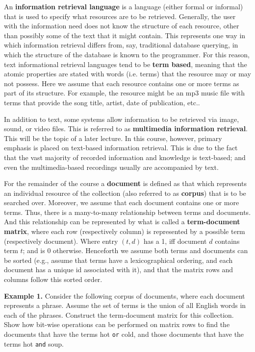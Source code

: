 \documentclass [12pt]{article}
\begin{document}
\vspace{0.5in}
An \textbf{information retrieval language} is a language (either formal or informal) that is
used to specify what resources are to be retrieved. Generally, the user with the  
information need does not know the structure of each resource, other than possibly some of the 
text that it might contain. This represents one way in which information retrieval 
differs from, say, traditional database querying, in which the structure of the database is
known to the programmer. 
For this reason, text informational retrieval languages tend to be 
\textbf{term based}, meaning that the atomic properties are  
stated with words (i.e. terms) that the resource may or may not possess. Here we assume that each 
resource contains one or more terms as part of its structure. For example, the resource might 
be an mp3 music file with terms that provide the song title, artist, date of publication, etc..

In addition to text, some systems allow information to be retrieved via image, sound, or video files.
This is referred to as \textbf{multimedia information retrieval}. This will be the topic of a later lecture.
In this course, however, primary emphasis is placed on text-based information retrieval. This is due to the fact
that the vast majority of recorded information and knowledge is text-based; and even the multimedia-based recordings
usually are accompanied by text.

For the remainder of the course a \textbf{document} is defined as that which 
represents an individual resource of the collection 
(also referred to as \textbf{corpus}) that is to be searched over. Moreover, we assume that each document
contains one or more terms. Thus, there is a many-to-many relationship between terms and documents. And this relationship can be represented by what is called a \textbf{term-document
matrix}, where each row (respectively column) is represented by a possible term (respectively
document). Where entry $(t,d)$ has a 1, iff document $d$ contains term $t$; and is 0 otherwise. Henceforth we assume both terms and documents can be sorted (e.g., assume that
terms have a lexicographical ordering, and each
document has a unique id associated with it), and that the matrix rows and columns follow this
sorted order. 

\newpage
\textbf{Example 1.} Consider the following corpus of documents, 
where each document represents a phrase.
Assume the set of terms is the union of all English words in each of the phrases. Construct
the term-document matrix for this collection. Show how bit-wise operations
can be performed on matrix rows to find the documents that have the terms 
hot \texttt{or} cold, and those documents that have the terms hot \texttt{and} soup.
\end{document}
